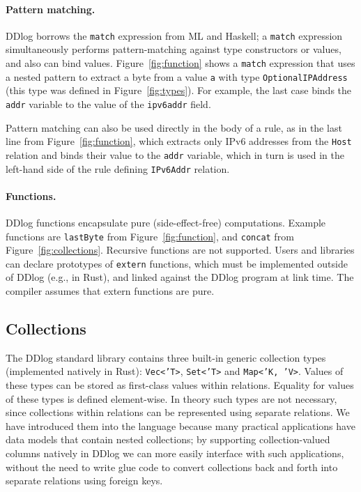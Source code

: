 \paragraph{Pattern matching.}  DDlog borrows
the \texttt{match} expression from ML and Haskell; a \texttt{match}
expression simultaneously performs pattern-matching against type
constructors or values, and also can bind values.
Figure~\ref{fig:function} shows a \texttt{match} expression that uses
a nested pattern to extract a byte from a value \texttt{a} with type
\texttt{OptionalIPAddress} (this type was defined in
Figure~\ref{fig:types}).  For example, the last case binds the
\texttt{addr} variable to the value of the \texttt{ipv6addr} field.

Pattern matching can also be used directly in the body of a rule, as
in the last line from Figure~\ref{fig:function}, which extracts only
IPv6 addresses from the \texttt{Host} relation and binds their value
to the \texttt{addr} variable, which in turn is used in the left-hand side of
the rule defining \texttt{IPv6Addr} relation.

\paragraph{Functions.}

DDlog functions encapsulate pure (side-effect-free) computations.
Example functions are \texttt{lastByte} from
Figure~\ref{fig:function}, and \texttt{concat} from
Figure~\ref{fig:collections}.  Recursive functions are not supported.
Users and libraries can declare prototypes of \texttt{extern}
functions, which must be implemented outside of DDlog (e.g., in Rust),
and linked against the DDlog program at link time.  The compiler
assumes that extern functions are pure.

\subsection{Collections}\label{sec:collections}

The DDlog standard library contains three built-in generic collection
types (implemented natively in Rust): \texttt{Vec<'T>},
\texttt{Set<'T>} and \texttt{Map<'K, 'V>}.  Values of these types can
be stored as first-class values within relations.  Equality for values
of these types is defined element-wise.  In theory such types are not
necessary, since collections within relations can be represented using
separate relations.  We have introduced them into the language because
many practical applications have data models that contain nested
collections; by supporting collection-valued columns natively in DDlog
we can more easily interface with such applications, without the need
to write glue code to convert collections back and forth into separate
relations using foreign keys.

